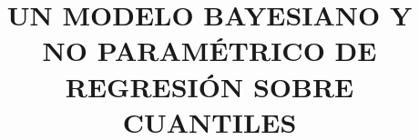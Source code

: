 \documentclass[oneside,11pt,review,usenames,dvipsnames]{report}
\begin{document}
\pagestyle{empty} %

\title{UN MODELO BAYESIANO Y NO PARAM\'ETRICO DE REGRESI\'ON SOBRE CUANTILES} %







%




\pagestyle{empty}
\begingroup
\setlength{\parskip}{0pt}
\tableofcontents
\endgroup


\clearpage
\pagestyle{fancy}
\fancyhf{}
\fancyhead[R]{\nouppercase{\leftmark}}
\cfoot{\thepage}










\nocite{*} %

 

\appendix


\end{document}
